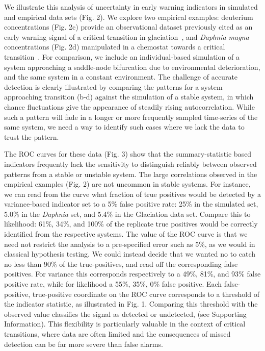 \documentclass[authoryear,preprint,11pt]{elsarticle}
\begin{document}
We illustrate this analysis of uncertainty in early warning indicators in simulated and empirical data sets (Fig. 2). 
We explore two empirical examples:
deuterium concentrations (Fig. 2c) provide an observational dataset
previously cited as an early warning signal of a critical transition in glaciation~\citep{Dakos2008},
and \emph{Daphnia magna} concentrations (Fig. 2d) manipulated in a chemostat towards a critical transition~\citep{Drake2010}.  
For comparison, we include an individual-based simulation of a system approaching a saddle-node bifurcation due to environmental deterioration,
and the same system in a constant environment. 
The challenge of accurate detection is clearly illustrated by comparing the patterns for a system approaching transition (b-d) 
against the simulation of a stable system, in which chance fluctuations give the appearance of steadily rising autocorrelation. 
While such a pattern will fade in a longer or more frequently sampled time-series of the same system, 
we need a way to identify such cases where we lack the data to trust the pattern.  

The ROC curves for these data (Fig. 3) show that the summary-statistic based indicators 
frequently lack the sensitivity to distinguish reliably between observed patterns from a stable or unstable system. 
The large correlations observed in the empirical examples (Fig. 2) are not uncommon in stable systems. 
For instance, we can read from the curve what fraction of true positives would be detected by a variance-based indicator
set to a 5\% false positive rate:
25\% in the simulated set,
5.0\% in the \emph{Daphnia} set,
and 5.4\% in the Glaciation data set.
Compare this to likelihood: 61\%, 34\%, and 100\% of the replicate true positives
would be correctly identified from the respective systems.
The value of the ROC curve is that we need not restrict the analysis to a pre-specified error such as 5\%,
as we would in classical hypothesis testing.  
We could instead decide that we wanted no to catch no less than 90\% of the true-positives,
and read off the corresponding false positives.  
For variance this corresponds respectively to a 49\%, 81\%, and 93\% false positive rate,
while for likelihood a 55\%, 35\%, 0\% false positive.
Each false-positive, true-positive coordinate on the ROC curve corresponds to a threshold of the indicator statistic,
as illustrated in Fig. 1.  
Comparing this threshold with the observed value classifies the signal as detected or undetected, (see Supporting Information).
This flexibility is particularly valuable in the context of critical transitions, 
where data are often limited and the consequences of missed detection can be far more severe than false alarms.  
\end{document}
